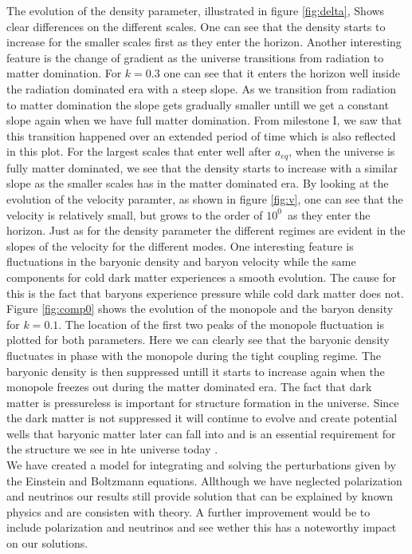 \documentclass[onecolumn]{aastex62}
\begin{document}
The evolution of the density parameter, illustrated in figure \ref{fig:delta}, Shows clear differences on the different scales. One can see that the density starts to increase for the smaller scales first as they enter the horizon. Another interesting feature is the change of gradient as the universe transitions from radiation to matter domination. For $k=0.3$ one can see that it enters the horizon well inside the radiation dominated era with a steep slope. As we transition from radiation to matter domination the slope gets gradually smaller untill we get a constant slope again when we have full matter domination. From milestone I, we saw that this transition happened over an extended period of time which is also reflected in this plot. For the largest scales that enter well after $a_{eq}$, when the universe is fully matter dominated, we see that the density starts to increase with a similar slope as the smaller scales has in the matter dominated era. By looking at the evolution of the velocity paramter, as shown in figure \ref{fig:v}, one can see that the velocity is relatively small, but grows to the order of $10^0$ as they enter the horizon. Just as for the density parameter the different regimes are evident in the slopes of the velocity for the different modes. One interesting feature is fluctuations in the baryonic density and baryon velocity while the same components for cold dark matter experiences a smooth evolution. The cause for this is the fact that baryons experience pressure while cold dark matter does not. Figure \ref{fig:comp0} shows the evolution of the monopole and the baryon density for $k=0.1$. The location of the first two peaks of the monopole fluctuation is plotted for both parameters. Here we can clearly see that the baryonic density fluctuates in phase with the monopole during the tight coupling regime. The baryonic density is then suppressed untill it starts to increase again when the monopole freezes out during the matter dominated era. The fact that dark matter is pressureless is important for structure formation in the universe. Since the dark matter is not suppressed it will continue to evolve and create potential wells that baryonic matter later can fall into and is an essential requirement for the structure we see in hte universe today \citep[p.15]{Shen:2019}.\\

We have created a model for integrating and solving the perturbations given by the Einstein and Boltzmann equations. Allthough we have neglected polarization and neutrinos our results still provide solution that can be explained by known physics and are consisten with theory. A further improvement would be to include polarization and neutrinos and see wether this has a noteworthy impact on our solutions.



\end{document}
